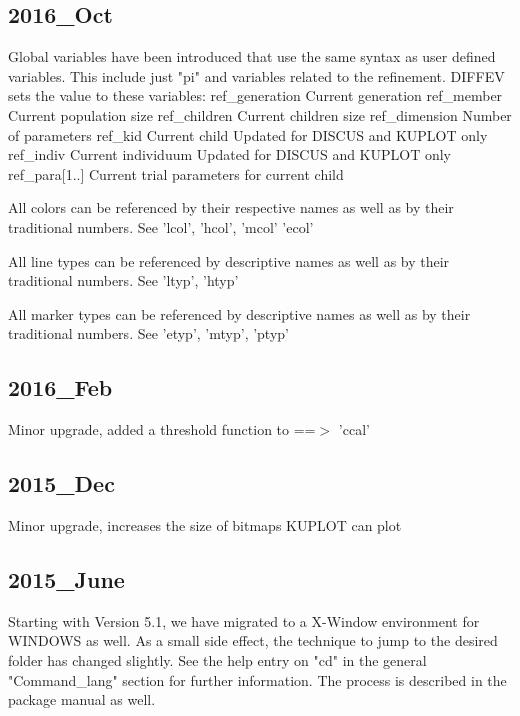 \subsection*{2016\_Oct}
\par
Global variables have been introduced that use the same syntax as 
user defined variables. This include just "pi" and variables related 
to the refinement. 
DIFFEV sets the value to these variables: 
ref\_generation  Current generation 
ref\_member      Current population size 
ref\_children    Current children size 
ref\_dimension   Number of parameters 
ref\_kid         Current child Updated for DISCUS and KUPLOT only 
ref\_indiv       Current individuum Updated for DISCUS and KUPLOT only 
ref\_para[1..]   Current trial parameters for current child 
\par
All colors can be referenced by their respective names as well as by 
their traditional numbers. See 'lcol', 'hcol', 'mcol' 'ecol' 
\par
All line types can be referenced by descriptive names as well as by 
their traditional numbers. See 'ltyp', 'htyp' 
\par
All marker types can be referenced by descriptive names as well as by 
their traditional numbers. See 'etyp', 'mtyp', 'ptyp' 
\subsection*{2016\_Feb}
\par
Minor upgrade, added a threshold function to ==$> $ 'ccal' 
\subsection*{2015\_Dec}
\par
Minor upgrade, increases the size of bitmaps KUPLOT can plot 
\subsection*{2015\_June}
\par
Starting with Version 5.1, we have migrated to a X-Window 
environment for WINDOWS as well. As a small side effect, 
the technique to jump to the desired folder has changed slightly. 
See the help entry on "cd" in the general "Command\_lang" section 
for further information. The process is described in the 
package manual as well. 
